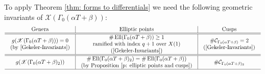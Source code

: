 \documentclass[11pt]{amsart}
\theoremstyle{definition}
\numberwithin{equation}{section}
\newcommand{\cC}{\mathcal{C}}		%
\newcommand{\sX}{\mathscr{X}}		%
\begin{document}
To apply Theorem \ref{thm: forms to differentials} we need the following geometric invariants of %
$\sX(\Gamma_0(\alpha T+\beta))$:
\[\begin{array}{c|c|c}
\text{Genera}&\text{Elliptic points}&\text{Cusps}\\
\hline
\hline
\begin{array}{c}g(\sX(\Gamma_0(\alpha T+\beta)))=0\\\text{(by \cite[Thm $8.1.(\mathrm{iii})$]{Gekeler-Invariants})}\end{array}&\begin{array}{c}\#\operatorname{Ell}(\Gamma_0(\alpha T+\beta))\geq1\\	\text{ramified with index }q+1\text{ over }X(1)\\\text{(\cite[Proposition $7.3$]{Gekeler-Invariants})}\end{array}&\begin{array}{c}\#\cC_{\Gamma_0(\alpha T+\beta)}=2\\\text{(\cite[Proposition $6.7.(\mathrm{i})$]{Gekeler-Invariants})}\end{array}\\
\hline
\hline
g(\sX(\Gamma_0(\alpha T+\beta)_2)) &\begin{array}{c}\#\operatorname{Ell}(\Gamma_0(\alpha T+\beta)_2)=\#\operatorname{Ell}(\Gamma_0(\alpha T+\beta))\\\text{(by Proposition \ref{p: elliptic points and cusps})}\end{array}&\#\cC_{\Gamma_0(\alpha T+\beta)_2}\\
\hline
\end{array}\]
\end{document}
